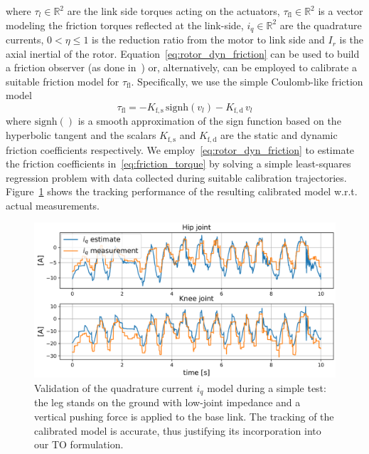 where $\tau_l\in\mathbb{R}^{2}$ are the link side torques acting on the actuators, $\tau_{\mathrm{fl}}\in\mathbb{R}^{2}$ is a vector modeling the friction torques reflected at the link-side, $i_q\in\mathbb{R}^{2}$ are the quadrature currents, $0 < \eta \leq 1$ is the reduction ratio from the motor to link side and $I_r$ is the axial inertial of the rotor. Equation~\eqref{eq:rotor_dyn_friction} can be used to build a friction observer (as done in~\cite{friction_comp::le2008friction}) or, alternatively, can be employed to calibrate a suitable friction model for $\tau_{\mathrm{fl}}$.
Specifically, we use the simple Coulomb-like friction model 
\begin{equation} \label{eq:friction_torque}
\tau_{\mathrm{fl}} = - K_{\mathrm{f, s}}\,\mathrm{signh}({v_l}) - K_{\mathrm{f, d}}\,v_l
\end{equation}
where $\mathrm{signh}()$ is a smooth approximation of the sign function based on the hyperbolic tangent and the scalars $K_{\mathrm{f, s}}$ and $K_{\mathrm{f, d}}$ are the static and dynamic friction coefficients respectively. We employ~\eqref{eq:rotor_dyn_friction} to estimate the friction coefficients in~\eqref{eq:friction_torque} by solving a simple least-squares regression problem with data collected during suitable calibration trajectories. Figure~\ref{fig:iq_model_tracking} shows the tracking performance of the resulting calibrated model w.r.t. actual measurements.
\begin{figure}
    \centering
    \includegraphics[width=1.0\columnwidth]{images/iq_tracking.pdf}
    \caption{Validation of the quadrature current $i_q$ model during a simple test: the leg stands on the ground with low-joint impedance and a vertical pushing force is applied to the base link. The tracking of the calibrated model is accurate, thus justifying its incorporation into our TO formulation.}
    \label{fig:iq_model_tracking}
\end{figure}
